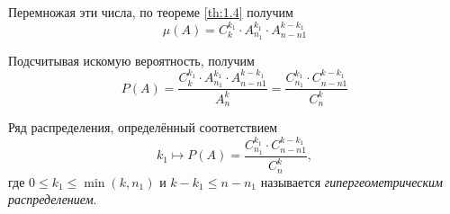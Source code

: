 Перемножая эти числа, по теореме \ref{th:1.4} получим
\begin{equation}
	\mu(A) = C_{k}^{k_1}\cdot A_{n_1}^{k_1}\cdot A_{n-n1}^{k-k_1}
\end{equation}

Подсчитывая искомую вероятность, получим
\begin{equation}
	P(A)=\frac{C_{k}^{k_1}\cdot A_{n_1}^{k_1}\cdot A_{n-n1}^{k-k_1}}{A_n^k}=\frac{C_{n_1}^{k_1}\cdot C_{n-n1}^{k-k_1}}{C_n^k}
\end{equation}

\begin{definition}
Ряд распределения, определённый соответствием
\begin{equation}
	k_1 \mapsto P(A) = \frac{C_{n_1}^{k_1}\cdot C_{n-n1}^{k-k_1}}{C_n^k},
\end{equation}
где $0 \leq k_1 \leq \min(k, n_1 )$ и $k - k_1 \leq n - n_1$ называется \textit{гипергеометрическим распределением}.
\end{definition}
